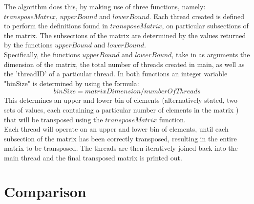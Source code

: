 \documentclass[journal, a4paper]{IEEEtran}
\begin{document}
The algorithm does this, by making use of three functions, namely: $transposeMatrix$, $upperBound$ and $lowerBound$. Each thread created is defined to perform the definitions found in $transposeMatrix$, on particular subsections of the matrix. The subsections of the matrix are determined by the values returned by the functions $upperBound$ and $lowerBound$.\\

Specifically, the functions $upperBound$ and $lowerBound$, take in as arguments the dimension of the matrix, the total number of threads created in main, as well as the 'threadID' of a particular thread. In both functions an integer variable "binSize" is determined by using the formula: \[binSize=matrixDimension/numberOfThreads\] This determines an upper and lower bin of elements (alternatively stated, two sets of values, each containing a particular number of elements in the matrix ) that will be transposed using the $transposeMatrix$ function.\\ 

Each thread will operate on an upper and lower bin of elements, until each subsection of the matrix has been correctly transposed, resulting in the entire matrix to be transposed. The threads are then iteratively joined back into the main thread and the final transposed matrix is printed out.  


\section{Comparison}
\end{document}
